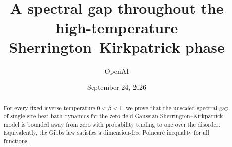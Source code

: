 \documentclass[11pt]{article}
\title{A spectral gap throughout the high-temperature\texorpdfstring{\\}{ }Sherrington--Kirkpatrick phase}
\author{OpenAI}
\date{September 24, 2026}
\begin{document}
\maketitle
\begin{abstract}
For every fixed inverse temperature $0<\beta<1$, we prove that the unscaled
spectral gap of single-site heat-bath dynamics for the zero-field Gaussian
Sherrington--Kirkpatrick model is bounded away from zero with probability
tending to one over the disorder. Equivalently, the Gibbs law satisfies a
dimension-free Poincar\'e inequality for all functions.
\end{abstract}
{\small\tableofcontents}
\clearpage









\end{document}
